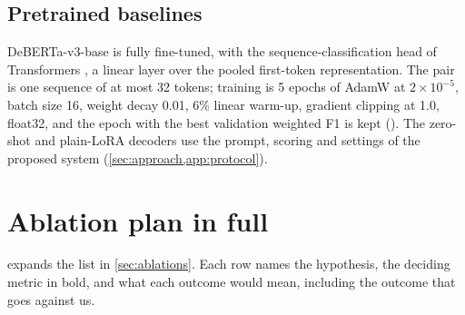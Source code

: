 \subsection{Pretrained baselines}
DeBERTa-v3-base \citep{he-etal-2023-debertav3} is fully fine-tuned, with the sequence-classification head of Transformers \citep{wolf-etal-2020-transformers}, a linear layer over the pooled first-token representation. The pair is one sequence of at most 32 tokens; training is 5 epochs of AdamW at $2 \times 10^{-5}$, batch size 16, weight decay 0.01, 6\% linear warm-up, gradient clipping at 1.0, float32, and the epoch with the best validation weighted F1 is kept (). The zero-shot and plain-LoRA decoders use the prompt, scoring and settings of the proposed system (\cref{sec:approach,app:protocol}).


\section{Ablation plan in full}
\label{app:ablations}

 expands the list in \cref{sec:ablations}. Each row names the hypothesis, the deciding metric in bold, and what each outcome would mean, including the outcome that goes against us.

